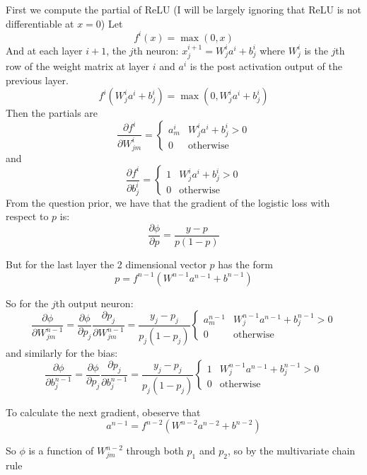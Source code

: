 \documentclass{article} %
\begin{document}
First we compute the
partial of ReLU (I will be largely ignoring that ReLU is not
differentiable at $x=0$) Let
\[
  f^i(x) = \max(0, x)
\]
And at each layer $i+1$, the $j$th neuron: $x^{i+1}_j = W^i_ja^i + b^i_j$ where
$W^i_j$ is the $j$th row of the weight matrix at layer $i$ and $a^i$ is the post
activation output of the previous layer.
\[
  f^i(W^i_ja^i + b^i_j)= \max(0, W^i_ja^i + b^i_j)
\]
Then the partials are
\[
  \frac{\partial f^i}{\partial W^i_{jm}} =
  \begin{cases}
    a^i_m & W^i_ja^i + b^i_j > 0  \\
    0 & \text{otherwise}
  \end{cases}
\]
and
\[
  \frac{\partial f^i}{\partial b^i_j} =
  \begin{cases}
    1 & W^i_ja^i + b^i_j > 0  \\
    0 & \text{otherwise}
  \end{cases}
\]
From the question prior, we have that the gradient of the logistic
loss with respect to $p$ is:
\[
  \frac{\partial \phi}{\partial p} = \frac{y-p}{p(1-p)}
\]

But for the last layer the 2 dimensional vector $p$ has the form
$$
p = f^{n-1}(W^{n-1}a^{n-1} + b^{n-1})
$$

So for the $j$th output neuron:
$$
\frac{\partial \phi}{\partial W^{n-1}_{jm}} = \frac{\partial
\phi}{\partial p_j}\frac{\partial p_j}{\partial W^{n-1}_{jm}} =
\frac{y_j - p_j}{p_j(1-p_j)}
\begin{cases}
  a^{n-1}_m & W^{n-1}_j a^{n-1} + b^{n-1}_j > 0 \\
  0 & \text{otherwise}
\end{cases}
$$
and similarly for the bias:
$$
\frac{\partial \phi}{\partial b^{n-1}_j} = \frac{\partial
\phi}{\partial p_j}\frac{\partial p_j}{\partial b^{n-1}_j} =
\frac{y_j - p_j}{p_j(1-p_j)}
\begin{cases}
  1 & W^{n-1}_j a^{n-1} + b^{n-1}_j > 0 \\
  0 & \text{otherwise}
\end{cases}
$$

To calculate the next gradient, obeserve that
\[
  a^{n-1} = f^{n-2}(W^{n-2}a^{n-2} + b^{n-2})
\]

So $\phi$ is a function of $W_{jm}^{n-2}$ through both $p_1$ and
$p_2$, so by the multivariate chain rule
\end{document}
